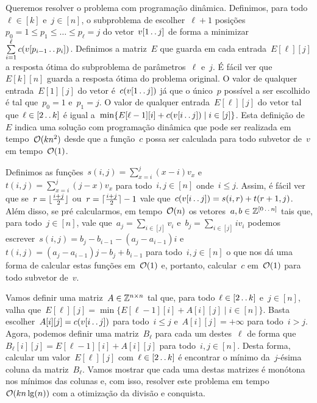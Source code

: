 Queremos resolver o problema com programação dinâmica. Definimos, para todo~${ \ell \in [k] }$ e~${ j \in [n] }$, o subproblema de escolher~${ \ell + 1 }$ posições~${ p_0 = 1 \leq p_1 \leq \dots \leq p_\ell = j }$ do vetor~$v[1 \,.\,.\, j]$ de forma a minimizar~${ \sum\limits_{i = 1}^\ell c(v[p_{i-1} \,.\,.\, p_i]) }$. Definimos a matriz~$E$ que guarda em cada entrada~$E[\ell][j]$ a resposta ótima do subproblema de parâmetros~$\ell$ e~$j$. É fácil ver que~$E[k][n]$ guarda a resposta ótima do problema original. O valor de qualquer entrada~$E[1][j]$ do vetor é~$c(v[1 \,.\,.\, j])$ já que o único~$p$ possível a ser escolhido é tal que~${ p_0 = 1 }$ e~${ p_1 = j }$. O valor de qualquer entrada~$E[\ell][j]$ do vetor tal que~${ \ell \in [2 \,.\,.\, k] }$ é igual a~${ \min\{E[\ell-1][i] + c(v[i \,.\,.\, j]) \mid i \in [j] \} }$. Esta definição de~$E$ indica uma solução com programação dinâmica que pode ser realizada em tempo~${ \mathcal{O}(kn^2)}$ desde que a função~$c$ possa ser calculada para todo subvetor de~$v$ em tempo~$\mathcal{O}(1)$.

Definimos as funções~${ s(i,j) = \sum\limits_{ x = i }^j (x - i)v_x }$ e~${ t(i,j) = \sum\limits_{ x = i }^j (j - x)v_x }$ para todo~${ i,j \in [n] }$ onde~${ i \leq j }$. Assim, é fácil ver que se~${ r = \lfloor\frac{i+j}{2}\rfloor }$ ou~${ r = \lceil\frac{i+j}{2}\rceil - 1 }$ vale que~${ c(v[i \,.\,.\, j]) = s(i,r) + t(r+1,j) }$. Além disso, se pré calcularmos, em tempo~$\mathcal{O}(n)$ os vetores~$a,b \in \mathbb{Z}^{[0 \,.\,.\, n]}$ tais que, para todo~${ j \in [n] }$, vale que~${ a_j = \sum\limits_{ i \in [j] } v_i }$ e~${ b_j = \sum\limits_{ i \in [j] } iv_i }$ podemos escrever~${ s(i,j) = b_j - b_{i-1} - (a_j - a_{i-1})i }$ e~${ t(i,j) = (a_j - a_{i-1})j - b_j + b_{i-1} }$ para todo~${ i,j \in [n] }$ o que nos dá uma forma de calcular estas funções em~$\mathcal{O}(1)$ e, portanto, calcular~$c$ em~$\mathcal{O}(1)$ para todo subvetor de~$v$.

Vamos definir uma matriz~$A \in \mathbb{Z}^{n \times n}$ tal que, para todo~${ \ell \in [2 \,.\,.\, k] }$ e~${ j \in [n] }$, valha que~${ E[\ell][j] = \min\{ E[\ell-1][i] + A[i][j] \mid i \in [n] \} }$. Basta escolher~${ A[i][j] = c(v[i \,.\,.\, j]) }$ para todo~${ i \leq j }$ e~${ A[i][j] = +\infty }$ para todo~${ i > j }$. Agora, podemos definir uma matriz~$B_\ell$ para cada um destes~$\ell$ de forma que~${ B_\ell[i][j] = E[\ell-1][i] + A[i][j] }$ para todo~${ i,j \in [n] }$. Desta forma, calcular um valor~${ E[\ell][j] }$ com~${ \ell \in [2 \,.\,.\, k] }$ é encontrar o mínimo da~$j$-ésima coluna da matriz~${ B_\ell }$. Vamos mostrar que cada uma destas matrizes é monótona nos mínimos das colunas e, com isso, resolver este problema em tempo~$\mathcal{O}(kn\lg(n))$ com a otimização da divisão e conquista.

